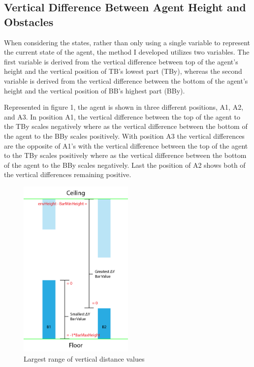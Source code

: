 \documentclass{article}
\begin{document}
\subsection{Vertical Difference Between Agent Height and Obstacles}

When considering the states, rather than only using a single variable to represent the current state of the agent, the method I developed utilizes two variables. The first variable is derived from the vertical difference between top of the agent's height and the vertical position of TB's lowest part (TBy),  whereas the second variable is derived from the vertical difference between the bottom of the agent's height and the vertical position of BB's highest part (BBy).

Represented in figure 1, the agent is shown in three different positions, A1, A2, and A3. In position A1, the vertical difference between the top of the agent to the TBy scales negatively where as the vertical difference between the bottom of the agent to the BBy scales positively. With position A3 the vertical differences are the opposite of A1's with the vertical difference between the top of the agent to the TBy scales positively where as the vertical difference between the bottom of the agent to the BBy scales negatively. Last the position of A2 shows both of the vertical differences remaining positive. 


\begin{figure}[h!]
    \centering
    \includegraphics[width=0.5\textwidth]{figure2}
    \caption{Largest range of vertical distance values}
    \label{fig:mesh2}
\end{figure}
\end{document}
